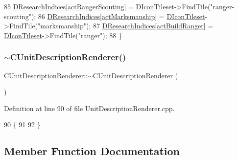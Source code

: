 \begin{DoxyCode}
85     \hyperlink{classCUnitDescriptionRenderer_aa34762a0be929d92ac9f0b151e3e3187}{DResearchIndices}[\hyperlink{GameDataTypes_8h_a35b98ce26aca678b03c6f9f76e4778cea7c23f07dfc3362bc9b85d704b5750fd8}{actRangerScouting}] = 
      \hyperlink{classCUnitDescriptionRenderer_aadf76b5c018d76c3ff7bd8edc021d702}{DIconTileset}->FindTile(\textcolor{stringliteral}{"ranger-scouting"});
86     \hyperlink{classCUnitDescriptionRenderer_aa34762a0be929d92ac9f0b151e3e3187}{DResearchIndices}[\hyperlink{GameDataTypes_8h_a35b98ce26aca678b03c6f9f76e4778cea23634cb2bfdd2dcc6f6cd6433b36df36}{actMarksmanship}] = 
      \hyperlink{classCUnitDescriptionRenderer_aadf76b5c018d76c3ff7bd8edc021d702}{DIconTileset}->FindTile(\textcolor{stringliteral}{"marksmanship"});
87     \hyperlink{classCUnitDescriptionRenderer_aa34762a0be929d92ac9f0b151e3e3187}{DResearchIndices}[\hyperlink{GameDataTypes_8h_a35b98ce26aca678b03c6f9f76e4778cead539d31a3eb945161800e6342a05fb11}{actBuildRanger}] = 
      \hyperlink{classCUnitDescriptionRenderer_aadf76b5c018d76c3ff7bd8edc021d702}{DIconTileset}->FindTile(\textcolor{stringliteral}{"ranger"});
88 \}
\end{DoxyCode}
\hypertarget{classCUnitDescriptionRenderer_ae1e7ba8e6987507bd11bc59af961155b}{}\label{classCUnitDescriptionRenderer_ae1e7ba8e6987507bd11bc59af961155b} 
\subsubsection{\texorpdfstring{$\sim$\+C\+Unit\+Description\+Renderer()}{~CUnitDescriptionRenderer()}}
{\footnotesize\ttfamily C\+Unit\+Description\+Renderer\+::$\sim$\+C\+Unit\+Description\+Renderer (\begin{DoxyParamCaption}{ }\end{DoxyParamCaption})}



Definition at line 90 of file Unit\+Description\+Renderer.\+cpp.


\begin{DoxyCode}
90                                                    \{
91     
92 \}
\end{DoxyCode}


\subsection{Member Function Documentation}
\hypertarget{classCUnitDescriptionRenderer_ae18d6862ae305bd5633558f86457270b}{}\label{classCUnitDescriptionRenderer_ae18d6862ae305bd5633558f86457270b} 
